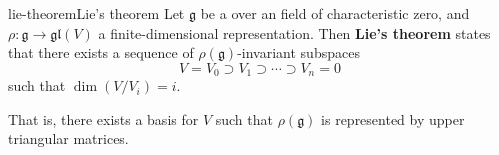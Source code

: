 
\begin{topic}{lie-theorem}{Lie's theorem}
    Let $\mathfrak{g}$ be a   over an  field of characteristic zero, and $\rho : \mathfrak{g} \to \mathfrak{gl}(V)$ a finite-dimensional representation. Then \textbf{Lie's theorem} states that there exists a sequence of $\rho(\mathfrak{g})$-invariant subspaces
    \[ V = V_0 \supset V_1 \supset \cdots \supset V_n = 0 \]
    such that $\dim (V/V_i) = i$.
    
    That is, there exists a basis for $V$ such that $\rho(\mathfrak{g})$ is represented by upper triangular matrices.
\end{topic}
